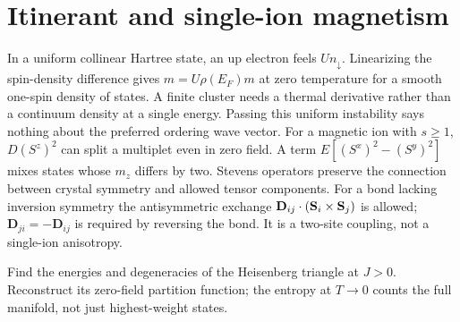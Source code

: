 \section{Itinerant and single-ion magnetism}
In a uniform collinear Hartree state, an up electron feels $U n_\downarrow$.
Linearizing the spin-density difference gives $m=U\rho(E_F)m$ at zero
temperature for a smooth one-spin density of states. A finite cluster
needs a thermal derivative rather than a continuum density at a
single energy. Passing this uniform instability says nothing about
the preferred ordering wave vector.
For a magnetic ion with $s\ge1$, $D(S^z)^2$ can split a multiplet even
in zero field. A term $E[(S^x)^2-(S^y)^2]$ mixes states whose $m_z$
differs by two. Stevens operators preserve the connection between
crystal symmetry and allowed tensor components. For a bond lacking
inversion symmetry the antisymmetric exchange
$\mathbf D_{ij}\cdot(\mathbf{S}_i\times\mathbf{S}_j)$ is allowed;
$\mathbf D_{ji}=-\mathbf D_{ij}$ is required by reversing the bond.
It is a two-site coupling, not a single-ion anisotropy.
\begin{exercise}\label{ex:triangle}
Find the energies and degeneracies of the Heisenberg triangle at
$J>0$. Reconstruct its zero-field partition function; the entropy
at $T\to0$ counts the full manifold, not just highest-weight states.
\end{exercise}
